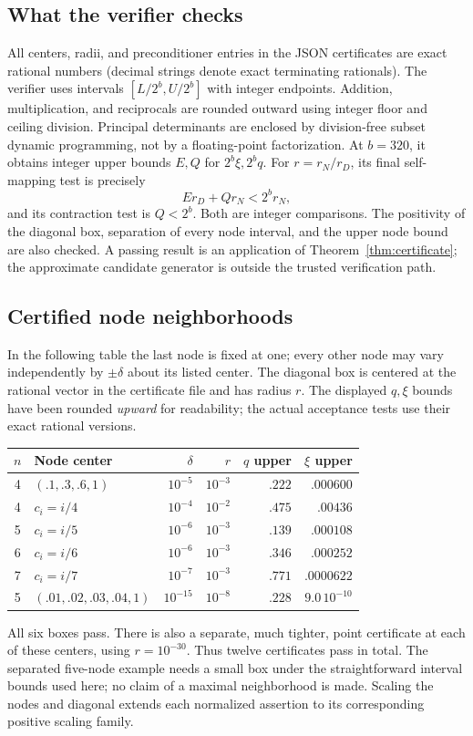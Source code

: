 \documentclass[11pt]{article}
\theoremstyle{remark}\newtheorem{remark}[theorem]{Remark}
\begin{document}
\subsection{What the verifier checks}
All centers, radii, and preconditioner entries in the JSON certificates are
exact rational numbers (decimal strings denote exact terminating rationals).
The verifier uses intervals $[L/2^b,U/2^b]$ with integer endpoints. Addition,
multiplication, and reciprocals are rounded outward using integer floor and
ceiling division. Principal determinants are enclosed by division-free
subset dynamic programming, not by a floating-point factorization.
At $b=320$, it obtains integer upper bounds $E,Q$ for $2^b\xi,2^bq$.
For $r=r_N/r_D$, its final self-mapping test is precisely
\[
 E r_D+Q r_N<2^b r_N,
\]
and its contraction test is $Q<2^b$. Both are integer comparisons. The
positivity of the diagonal box, separation of every node interval, and the
upper node bound are also checked. A passing result is an application of
Theorem~\ref{thm:certificate}; the approximate candidate generator is outside
the trusted verification path.

\subsection{Certified node neighborhoods}
In the following table the last node is fixed at one; every other node may
vary independently by $\pm\delta$ about its listed center. The diagonal
box is centered at the rational vector in the certificate file and has
radius $r$. The displayed $q,\xi$ bounds have been rounded \emph{upward}
for readability; the actual acceptance tests use their exact rational
versions.

\begin{center}\small
\begin{tabular}{@{}clrrrr@{}}
\toprule
$n$ & Node center & $\delta$ & $r$ & $q$ upper & $\xi$ upper\\
\midrule
4 & $(.1,.3,.6,1)$ & $10^{-5}$ & $10^{-3}$ & $.222$ & $.000600$\\
4 & $c_i=i/4$ & $10^{-4}$ & $10^{-2}$ & $.475$ & $.00436$\\
5 & $c_i=i/5$ & $10^{-6}$ & $10^{-3}$ & $.139$ & $.000108$\\
6 & $c_i=i/6$ & $10^{-6}$ & $10^{-3}$ & $.346$ & $.000252$\\
7 & $c_i=i/7$ & $10^{-7}$ & $10^{-3}$ & $.771$ & $.0000622$\\
5 & $(.01,.02,.03,.04,1)$ & $10^{-15}$ & $10^{-8}$ & $.228$ & $9.0\,10^{-10}$\\
\bottomrule
\end{tabular}
\end{center}
All six boxes pass. There is also a separate, much tighter, point certificate
at each of these centers, using $r=10^{-30}$. Thus twelve certificates pass
in total. The separated five-node example needs a small box under the
straightforward interval bounds used here; no claim of a maximal neighborhood
is made. Scaling the nodes and diagonal extends each normalized assertion to
its corresponding positive scaling family.
\end{document}
